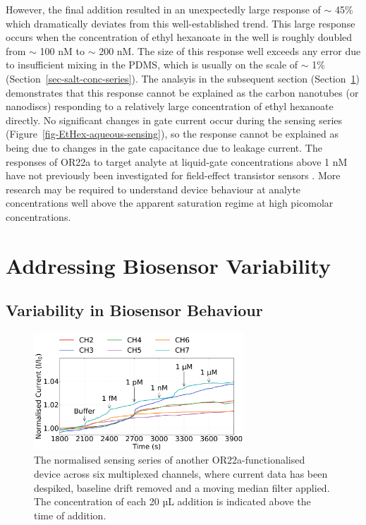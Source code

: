 \documentclass[
  a4paper,
]{scrbook}
\begin{document}
However, the final addition resulted in an unexpectedly large response
of \(\sim\) 45\% which dramatically deviates from this well-established
trend. This large response occurs when the concentration of ethyl
hexanoate in the well is roughly doubled from \(\sim\) 100 nM to
\(\sim\) 200 nM. The size of this response well exceeds any error due to
insufficient mixing in the PDMS, which is usually on the scale of
\(\sim\) 1\% (Section~\ref{sec-salt-conc-series}). The analsyis in the
subsequent section (Section~\ref{sec-variability}) demonstrates that
this response cannot be explained as the carbon nanotubes (or nanodiscs)
responding to a relatively large concentration of ethyl hexanoate
directly. No significant changes in gate current occur during the
sensing series (Figure~\ref{fig-EtHex-aqueous-sensing}), so the response
cannot be explained as being due to changes in the gate capacitance due
to leakage current. The responses of OR22a to target analyte at
liquid-gate concentrations above 1 nM have not previously been
investigated for field-effect transistor sensors
\autocite{Murugathas2019a,Murugathas2020}. More research may be required
to understand device behaviour at analyte concentrations well above the
apparent saturation regime at high picomolar concentrations.

\hypertarget{sec-variability}{%
\section{Addressing Biosensor Variability}\label{sec-variability}}

\hypertarget{sec-variability-biosensor}{%
\subsection{Variability in Biosensor
Behaviour}\label{sec-variability-biosensor}}

\begin{figure}

{\centering \includegraphics[width=0.7\textwidth,height=\textheight]{figures/ch8/Q4C4_OR22a_Functionalised_filtered_detrend_trunc_arrows_normalised.png}

}

\caption{\label{fig-OR22a-variability}The normalised sensing series of
another OR22a-functionalised device across six multiplexed channels,
where current data has been despiked, baseline drift removed and a
moving median filter applied. The concentration of each 20 µL addition
is indicated above the time of addition.}

\end{figure}
\end{document}
